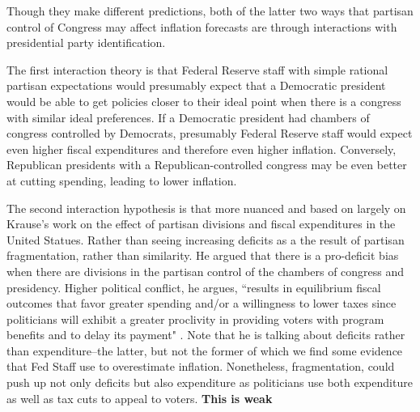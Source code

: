 \documentclass[a4paper]{article}\usepackage{graphicx, color}
\begin{document}
Though they make different predictions, both of the latter two ways that partisan control of Congress may affect inflation forecasts are through interactions with presidential party identification.

The first interaction theory is that Federal Reserve staff with simple rational partisan expectations would presumably expect that a Democratic president would be able to get policies closer to their ideal point when there is a congress with similar ideal preferences. If a Democratic president had chambers of congress controlled by Democrats, presumably Federal Reserve staff would expect even higher fiscal expenditures and therefore even higher inflation. Conversely, Republican presidents with a Republican-controlled congress may be even better at cutting spending, leading to lower inflation.

The second interaction hypothesis is that more nuanced and based on largely on Krause's \citeyearpar{Krause2000} work on the effect of partisan divisions and fiscal expenditures in the United Statues. Rather than seeing increasing deficits as a the result of partisan fragmentation, rather than similarity. He argued that there is a pro-deficit bias when there are divisions in the partisan control of the chambers of congress and presidency. Higher political conflict, he argues, ``results in equilibrium fiscal outcomes that favor greater spending and/or a willingness to lower taxes since politicians will exhibit a greater proclivity in providing voters with program benefits and to delay its payment" \citep[][542]{Krause2000}. Note that he is talking about deficits rather than expenditure--the latter, but not the former of which we find some evidence that Fed Staff use to overestimate inflation. Nonetheless, fragmentation, could push up not only deficits but also expenditure as politicians use both expenditure as well as tax cuts to appeal to voters. \textbf{This is weak}
\end{document}
